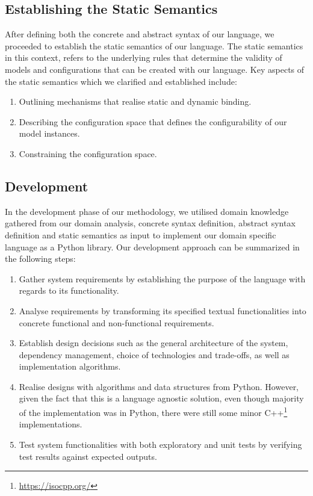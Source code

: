 \documentclass[conference]{IEEEtran}
\newcommand{\foot}[1]{\footnote{\url{#1}}}
\begin{document}
\subsection{Establishing the Static Semantics}
After defining both the concrete and abstract syntax of our language, we proceeded to establish the static semantics of our language. The static semantics in this context, refers to the underlying rules that determine the validity of models and configurations that can be created with our language. Key aspects of the static semantics which we clarified and established include:
\begin{enumerate}
    \item Outlining mechanisms that realise static and dynamic binding.
    \item Describing the configuration space that defines the configurability of our model instances.
    \item Constraining the configuration space.
\end{enumerate}

\subsection{Development}
In the development phase of our methodology, we utilised domain knowledge gathered from our domain analysis, concrete syntax definition, abstract syntax definition and static semantics as input to implement our domain specific language as a Python library. Our development approach can be summarized in the following steps:
\begin{enumerate}
    \item Gather system requirements by establishing the purpose of the language with regards to its functionality.
    \item Analyse requirements by transforming its specified textual functionalities into concrete functional and non-functional requirements.
    \item Establish design decisions such as the general architecture of the system, dependency management, choice of technologies and trade-offs, as well as implementation algorithms.
    \item Realise designs with algorithms and data structures from Python. However, given the fact that this is a language agnostic solution, even though majority of the implementation was in Python, there were still some minor C++\foot{https://isocpp.org/} implementations.
    \item Test system functionalities with both exploratory and unit tests by verifying test results against expected outputs.
 \end{enumerate}
 
\end{document}
